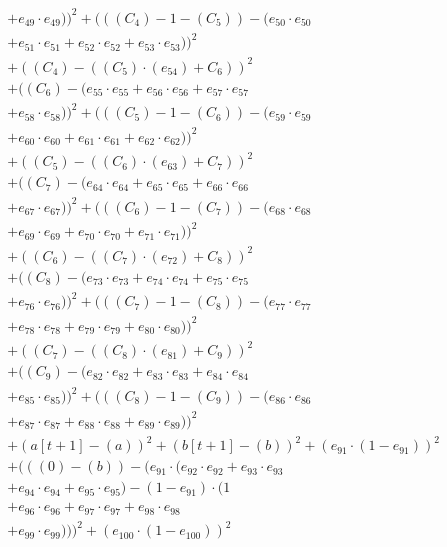 \documentclass[10pt, a4paper]{article}
\begin{document}
\begin{small}
\begin{align*}
& + e_{49} \cdot e_{49}))^{2} + (((C_{4}) - 1 - (C_{5})) - (e_{50} \cdot e_{50} \\
& + e_{51} \cdot e_{51} + e_{52} \cdot e_{52} + e_{53} \cdot e_{53}))^{2} \\
& + ((C_{4}) - ((C_{5})  \cdot  (e_{54}) + C_{6}))^{2} \\
& + ((C_{6}) - (e_{55} \cdot e_{55} + e_{56} \cdot e_{56} + e_{57} \cdot e_{57} \\
& + e_{58} \cdot e_{58}))^{2} + (((C_{5}) - 1 - (C_{6})) - (e_{59} \cdot e_{59} \\
& + e_{60} \cdot e_{60} + e_{61} \cdot e_{61} + e_{62} \cdot e_{62}))^{2} \\
& + ((C_{5}) - ((C_{6})  \cdot  (e_{63}) + C_{7}))^{2} \\
& + ((C_{7}) - (e_{64} \cdot e_{64} + e_{65} \cdot e_{65} + e_{66} \cdot e_{66} \\
& + e_{67} \cdot e_{67}))^{2} + (((C_{6}) - 1 - (C_{7})) - (e_{68} \cdot e_{68} \\
& + e_{69} \cdot e_{69} + e_{70} \cdot e_{70} + e_{71} \cdot e_{71}))^{2} \\
& + ((C_{6}) - ((C_{7})  \cdot  (e_{72}) + C_{8}))^{2} \\
& + ((C_{8}) - (e_{73} \cdot e_{73} + e_{74} \cdot e_{74} + e_{75} \cdot e_{75} \\
& + e_{76} \cdot e_{76}))^{2} + (((C_{7}) - 1 - (C_{8})) - (e_{77} \cdot e_{77} \\
& + e_{78} \cdot e_{78} + e_{79} \cdot e_{79} + e_{80} \cdot e_{80}))^{2} \\
& + ((C_{7}) - ((C_{8})  \cdot  (e_{81}) + C_{9}))^{2} \\
& + ((C_{9}) - (e_{82} \cdot e_{82} + e_{83} \cdot e_{83} + e_{84} \cdot e_{84} \\
& + e_{85} \cdot e_{85}))^{2} + (((C_{8}) - 1 - (C_{9})) - (e_{86} \cdot e_{86} \\
& + e_{87} \cdot e_{87} + e_{88} \cdot e_{88} + e_{89} \cdot e_{89}))^{2} \\
& + (a[t+1] - (a))^{2} + (b[t+1] - (b))^{2} + (e_{91} \cdot (1 - e_{91}))^{2} \\
& + (((0) - (b)) - (e_{91} \cdot (e_{92} \cdot e_{92} + e_{93} \cdot e_{93} \\
& + e_{94} \cdot e_{94} + e_{95} \cdot e_{95}) - (1 - e_{91}) \cdot (1 \\
& + e_{96} \cdot e_{96} + e_{97} \cdot e_{97} + e_{98} \cdot e_{98} \\
& + e_{99} \cdot e_{99})))^{2} + (e_{100} \cdot (1 - e_{100}))^{2} \\

\end{align*}
\end{small}
\end{document}
